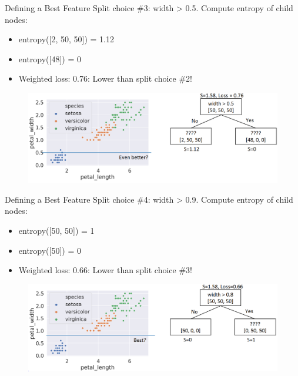 \documentclass[aspectratio=169]{../latex_main/tntbeamer}  %
\begin{document}
	
	\begin{frame}{Defining a Best Feature}
	    Split choice \#3: width > 0.5. Compute entropy of child nodes:
	    \begin{itemize}
	        \item entropy([2, 50, 50]) = 1.12
	        \item entropy([48]) = 0
	        \item Weighted loss: 0.76: Lower than split choice \#2!

	    \end{itemize}
	    
	    \begin{figure}
	        \centering
	        \includegraphics[scale=.4]{Bild50}
	    \end{figure}
	\end{frame}
	
	
	\begin{frame}{Defining a Best Feature}
 	    Split choice \#4: width > 0.9. Compute entropy of child nodes:
	    \begin{itemize}
	        \item entropy([50, 50]) = 1
	        \item entropy([50]) = 0
	        \item Weighted loss: 0.66: Lower than split choice \#3!

	    \end{itemize}
	    
	    \begin{figure}
	        \centering
	        \includegraphics[scale=.4]{Bild51}
	    \end{figure}
	\end{frame}
	
\end{document}
